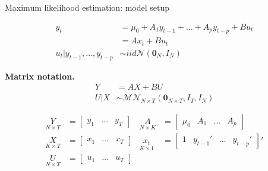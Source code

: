 \documentclass[notes,blackandwhite,mathsans,usenames,dvipsnames]{beamer}
\begin{document}
\begin{frame}{Maximum likelihood estimation: model setup}

\begin{align*}
y_t &= \mu_0 + A_1y_{t-1} + \dots + A_py_{t-p} + Bu_t\\
&=  Ax_{t} + Bu_t\\
u_t|y_{t-1},\dots ,y_{t-p} &\sim iid\mathcal{N}\left(\mathbf{0}_N,I_N\right)
\end{align*}

\bigskip\textbf{Matrix notation.}
\begin{align*}
Y &=  AX + BU\\
U|X &\sim\mathcal{MN}_{N\times T}\left(\mathbf{0}_{N\times T}, I_T, I_N\right)
\end{align*}

\footnotesize
\begin{align*}
\underset{N\times T}{Y} &= \begin{bmatrix} y_1 &\dots& y_T \end{bmatrix} &
\underset{N\times K}{A}&= \begin{bmatrix} \mu_0& A_1 &\dots& A_p \end{bmatrix}\\
\underset{K\times T}{X} &= \begin{bmatrix} x_1 &\dots& x_T \end{bmatrix}&
\underset{K\times 1}{x_t}&= \begin{bmatrix} 1 & y_{t-1}' &\dots& y_{t-p}' \end{bmatrix}'\\
\underset{N\times T}{U} &= \begin{bmatrix} u_1 &\dots& u_T \end{bmatrix}&&
\end{align*}
\end{frame}
\end{document}
